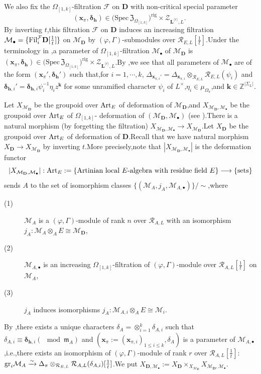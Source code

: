\documentclass[SecEq,CM,GP]{degruyter-crelle} %
\theoremstyle{plain}
\newcommand{\Art}{{\rm Art}}
\newcommand{\Dpik}{{\mathbf{D}}}
\newcommand{\fil}{{\rm Fil}}
\newcommand{\gr}{{\rm gr}}
\newcommand{\lrr}{{\langle r\rangle}}
\newcommand{\omepik}{\Omega_{[1,k]}}
\newcommand{\rigchl}{{\mathcal{Z}_{\bL^{\lrr},L}}}
\newcommand{\sbanpik}{{\big(\mathrm{Spec}\hspace{2pt}\mathfrak{Z}_{\omepik}\big)^{\mathrm{rig}}}}
\newcommand{\BZ}{{\mathbb{Z}}}
\newcommand{\bL}{{\mathbf{L}}}
\newcommand{\bx}{{\mathbf{x}}}
\newcommand{\bh}{{\mathbf{h}}}
\newcommand{\bk}{{\mathbf{k}}}
\newcommand{\cR}{\mathcal R}
\newcommand{\cM}{\mathcal M}
\newcommand{\cF}{\mathcal F}
\begin{document}
We also fix the $\omepik$-filtration  $\cF$ on $\Dpik$ with non-critical special parameter \[(\bx_{\pi},\bm{\delta}_{\bh})\in \sbanpik\times\rigchl.\;\]By inverting $t$,\;this filtration $\cF$ on $\Dpik$ induces an increasing filtration $\cM_{\bullet}=\{\fil_{i}^\cF \Dpik[\frac{1}{t}]\}$ on $\cM_\Dpik$ by $(\varphi,\Gamma)$-submodules over $\cR_{E,L}[\frac{1}{t}]$.\;Under the terminology in \cite[Section 6.2]{Ding2021},\;a parameter of $\omepik$-filtration $\cM_{\bullet}$ of $\cM_\Dpik$ is $(\bx_{\pi},\bm{\delta}_{\bh})\in \sbanpik\times\rigchl $.\;By \cite[Lemmma 6.2.1]{Ding2021},\;we see that all parameters of $\cM_{\bullet}$ are of the form $(\bx_{\pi}',\bm{\delta}_{\bh}')$ such that,\;for $i=1,\cdots,k$,\; $\Delta_{{\bx}_{\pi,i}'}=\Delta_{{\bx}_{\pi,i}}\otimes_{\cR_{E,L}} \cR_{E,L}(\psi_i)$ and $\bm{\delta}_{\bh,i}'=\bm{\delta}_{\bh,i}\psi_i^{-1}\eta_iz^\bk$ for some unramified character $\psi_i$ of $L^\times$,\;$\eta_i\in \mu_{\Omega_\pi}$,\;and $\bk\in \BZ^{|\Sigma_L|}$.\;

Let $X_{\cM_\Dpik}$ be the groupoid over $\Art_E$ of deformation of $\cM_\Dpik$,\;and $X_{\cM_\Dpik,\cM_{\bullet}}$ be the groupoid over $\Art_E$ of $\omepik$- deformation of $(\cM_\Dpik,\cM_{\bullet})$ (see \cite[Section 6.2]{Ding2021}).\;There is a natural morphism (by forgetting the filtration) $X_{\cM_\Dpik,\cM_{\bullet}}\rightarrow X_{\cM_\Dpik} $.\;Let $X_{\Dpik}$  be the groupoid over $\Art_E$ of deformation of $\Dpik$.\;Recall that we have natural morphism $X_{\Dpik}\rightarrow X_{\cM_\Dpik}$
by inverting $t$.\;More precisely,\;note that $|X_{\cM_\Dpik,\cM_{\bullet}}|$ is the deformation functor
\[|X_{\cM_\Dpik,\cM_{\bullet}}|:\Art_E:=\{\text{Artinian local $E$-algebra with residue field $E$}\}\longrightarrow \{\text{sets}\}\]
sends $A$ to the set of isomorphism classes $\{(\cM_A,j_A,\cM_{A,\bullet})\}/\sim$,\;where
\begin{description}
\item[(1)] $\cM_A$ is a $(\varphi,\Gamma)$-module of rank $n$ over $\cR_{A,L}$ with an isomorphism $j_A:\cM_A\otimes_AE\cong \cM_\Dpik$,
\item[(2)] $\cM_{A,\bullet}$ is an increasing  $\omepik$-filtration of $(\varphi,\Gamma)$-module over $\cR_{A,L}[\frac{1}{t}]$ on $\cM_A$,
\item[(3)] $j_A$ induces isomorphisms $j_A:\cM_{A,i}\otimes_AE\cong \cM_i$.\;
\end{description}
By \cite[Lemma 6.2.2]{Ding2021},\;there exists a unique characters $\delta_A=\otimes_{i=1}^k{\delta}_{A,i}$ such that ${\delta}_{A,i}\equiv \bm{\delta}_{\bh,i}(\mod \mathfrak{m}_A)$ and 
$(\bx_{\pi}:=(\bx_{\pi,i})_{1\leq i\leq k},\delta_A)$ is a parameter of $\cM_{A,\bullet}$,\;i.e.,\;there exists an isomorphism of $(\varphi,\Gamma)$-module of rank $r$ over $\cR_{A,L}[\frac{1}{t}]$:\;$\gr_i\cM_A\xrightarrow{\sim}{\Delta_\pi}\otimes_{\cR_{E,L}}\cR_{A,L}({\delta}_{A,i})[\frac{1}{t}]$.\;We put $X_{\Dpik,\cM_{\bullet}}:=X_{\Dpik}\times_{X_{\cM_\Dpik}}X_{\cM_\Dpik,\cM_{\bullet}}$.\;
\end{document}
